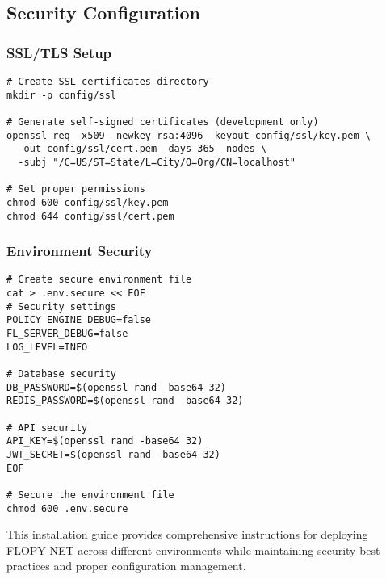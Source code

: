 \subsection{Security Configuration}

\subsubsection{SSL/TLS Setup}

\begin{lstlisting}[style=bashcode, caption=SSL Certificate Setup]
# Create SSL certificates directory
mkdir -p config/ssl

# Generate self-signed certificates (development only)
openssl req -x509 -newkey rsa:4096 -keyout config/ssl/key.pem \
  -out config/ssl/cert.pem -days 365 -nodes \
  -subj "/C=US/ST=State/L=City/O=Org/CN=localhost"

# Set proper permissions
chmod 600 config/ssl/key.pem
chmod 644 config/ssl/cert.pem
\end{lstlisting}

\subsubsection{Environment Security}

\begin{lstlisting}[style=bashcode, caption=Security Hardening]
# Create secure environment file
cat > .env.secure << EOF
# Security settings
POLICY_ENGINE_DEBUG=false
FL_SERVER_DEBUG=false
LOG_LEVEL=INFO

# Database security
DB_PASSWORD=$(openssl rand -base64 32)
REDIS_PASSWORD=$(openssl rand -base64 32)

# API security
API_KEY=$(openssl rand -base64 32)
JWT_SECRET=$(openssl rand -base64 32)
EOF

# Secure the environment file
chmod 600 .env.secure
\end{lstlisting}

This installation guide provides comprehensive instructions for deploying FLOPY-NET across different environments while maintaining security best practices and proper configuration management.
